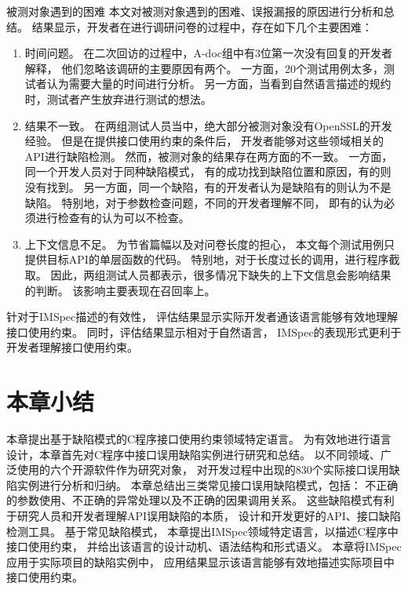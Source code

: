 {\kaishu 被测对象遇到的困难 }
本文对被测对象遇到的困难、误报漏报的原因进行分析和总结。
结果显示，开发者在进行调研问卷的过程中，存在如下几个主要困难：
\begin{enumerate}
	\item 时间问题。
	在二次回访的过程中，A-doc组中有3位第一次没有回复的开发者解释，
	他们忽略该调研的主要原因有两个。
	一方面，20个测试用例太多，测试者认为需要大量的时间进行分析。
	另一方面，当看到自然语言描述的规约时，测试者产生放弃进行测试的想法。
	\item 结果不一致。
	在两组测试人员当中，绝大部分被测对象没有OpenSSL的开发经验。
	但是在提供接口使用约束的条件后，
	开发者能够对这些领域相关的API进行缺陷检测。
	然而，被测对象的结果存在两方面的不一致。
	一方面，同一个开发人员对于同种缺陷模式，
	有的成功找到缺陷位置和原因，有的则没有找到。
	另一方面，同一个缺陷，有的开发者认为是缺陷有的则认为不是缺陷。
	特别地，对于参数检查问题，不同的开发者理解不同，
	即有的认为必须进行检查有的认为可以不检查。
	\item 上下文信息不足。
	为节省篇幅以及对问卷长度的担心，
	本文每个测试用例只提供目标API的单层函数的代码。
	特别地，对于长度过长的调用，进行程序截取。
	因此，两组测试人员都表示，很多情况下缺失的上下文信息会影响结果的判断。
	该影响主要表现在召回率上。
\end{enumerate}
	
针对于IMSpec描述的有效性，
评估结果显示实际开发者通该语言能够有效地理解接口使用约束。
同时，评估结果显示相对于自然语言，
IMSpec的表现形式更利于开发者理解接口使用约束。

\section{本章小结}
\label{sec:2.6}
本章提出基于缺陷模式的C程序接口使用约束领域特定语言。
为有效地进行语言设计，本章首先对C程序中接口误用缺陷实例进行研究和总结。
以不同领域、广泛使用的六个开源软件作为研究对象，
对开发过程中出现的830个实际接口误用缺陷实例进行分析和归纳。
本章总结出三类常见接口误用缺陷模式，包括：
不正确的参数使用、不正确的异常处理以及不正确的因果调用关系。
这些缺陷模式有利于研究人员和开发者理解API误用缺陷的本质，
设计和开发更好的API、接口缺陷检测工具。
基于常见缺陷模式，
本章提出IMSpec领域特定语言，以描述C程序中接口使用约束，
并给出该语言的设计动机、语法结构和形式语义。
本章将IMSpec应用于实际项目的缺陷实例中，
应用结果显示该语言能够有效地描述实际项目中接口使用约束。
